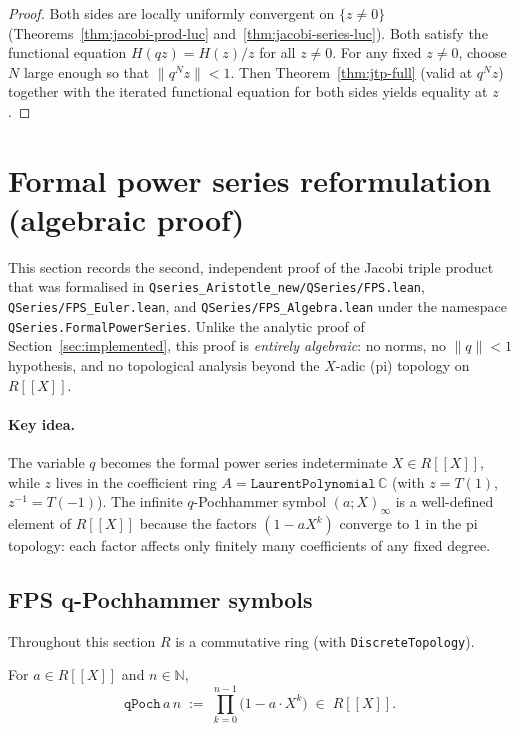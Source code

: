 \begin{proof}\leanok{}
Both sides are locally uniformly convergent on $\{z \neq 0\}$
(Theorems~\ref{thm:jacobi-prod-luc} and~\ref{thm:jacobi-series-luc}).
Both satisfy the functional equation $H(qz) = H(z)/z$ for all $z \neq 0$.
For any fixed $z \neq 0$, choose $N$ large enough so that $\|q^N z\| < 1$.
Then Theorem~\ref{thm:jtp-full} (valid at $q^N z$) together with the
iterated functional equation for both sides yields equality at $z$.
\end{proof}


\section{Formal power series reformulation (algebraic proof)}
\label{sec:fps}

This section records the second, independent proof of the Jacobi triple product
that was formalised in \texttt{Qseries\_Aristotle\_new/QSeries/FPS.lean},
\texttt{QSeries/FPS\_Euler.lean}, and \texttt{QSeries/FPS\_Algebra.lean} under the namespace
\texttt{QSeries.FormalPowerSeries}. Unlike the analytic proof of Section~\ref{sec:implemented},
this proof is \emph{entirely algebraic}: no norms, no $\|q\| < 1$ hypothesis, and
no topological analysis beyond the $X$-adic (pi) topology on $R[\![ X ]\!]$.

\paragraph{Key idea.}
The variable $q$ becomes the formal power series indeterminate $X \in R[\![ X]\!]$,
while $z$ lives in the coefficient ring
$A = \texttt{LaurentPolynomial}\,\mathbb{C}$ (with $z = T(1)$,
$z^{-1} = T(-1)$). The infinite $q$-Pochhammer symbol $(a; X)_\infty$
is a well-defined element of $R[\![ X]\!]$ because the factors
$(1 - a X^k)$ converge to $1$ in the pi topology: each factor affects only
finitely many coefficients of any fixed degree.

\subsection{FPS q-Pochhammer symbols}
\label{subsec:fps-qpoch}

Throughout this section $R$ is a commutative ring (with \texttt{DiscreteTopology}).

\begin{definition}\label{def:fps-qPoch}\leanok
For $a \in R[\![ X]\!]$ and $n \in \mathbb{N}$,
\[
  \texttt{qPoch}\,a\,n
  \;:=\; \prod_{k=0}^{n-1}\bigl(1 - a\cdot X^k\bigr)
  \;\in\; R[\![ X]\!].
\]
\end{definition}

